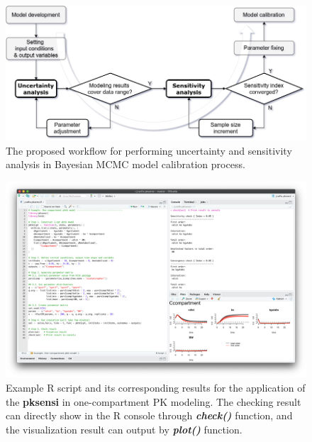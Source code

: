 \documentclass[preprint,12pt, a4paper]{elsarticle}
\begin{document}

 


\newpage

\clearpage
\newpage

\begin{landscape}

\begin{figure}
\includegraphics[width=1\linewidth]{workflow} 
\caption{The proposed workflow for performing uncertainty and sensitivity analysis in Bayesian MCMC model calibration process.}
\label{fig:workflow}
\end{figure}

\clearpage
\newpage

\begin{figure}
\includegraphics[width=1\linewidth]{example-1} 
\caption{Example R script and its corresponding results for the application of the \textbf{pksensi} in one-compartment PK modeling. The checking result can directly show in the R console through \textit{\textbf{check()}} function, and the visualization result can output by \textit{\textbf{plot()}} function.}
\label{fig:example-1}
\end{figure}


\end{landscape}
\end{document}
